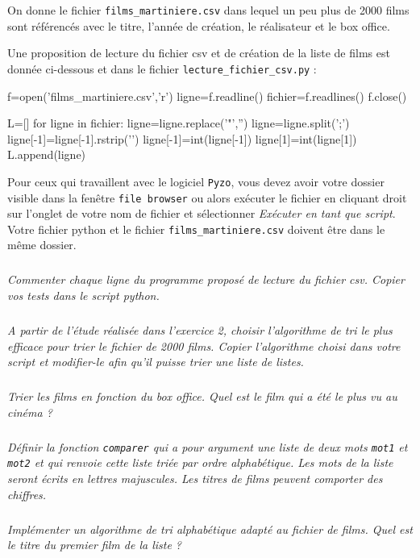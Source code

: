 On donne le fichier \texttt{films\_martiniere.csv} dans lequel un peu plus de 2000 films sont référencés avec le titre, l'année de création, le réalisateur et le box office.

Une proposition de lecture du fichier csv et de création de la liste de films est donnée ci-dessous et dans le fichier \texttt{lecture\_fichier\_csv.py} :

\begin{python}
f=open('films_martiniere.csv','r')
ligne=f.readline()
fichier=f.readlines()
f.close()

L=[]
for ligne in fichier:
    ligne=ligne.replace('"','')
    ligne=ligne.split(';')
    ligne[-1]=ligne[-1].rstrip('\n')
    ligne[-1]=int(ligne[-1])
    ligne[1]=int(ligne[1])
    L.append(ligne)
\end{python}

Pour ceux qui travaillent avec le logiciel \texttt{Pyzo}, vous devez avoir votre dossier visible dans la fenêtre \texttt{file browser} ou alors exécuter le fichier en cliquant droit sur l'onglet de votre nom de fichier et sélectionner \textit{Exécuter en tant que script}. Votre fichier python et le fichier \texttt{films\_martiniere.csv} doivent être dans le même dossier.

\subparagraph{}
\textit{Commenter chaque ligne du programme proposé de lecture du fichier csv. Copier vos tests dans le script python.}

\subparagraph{}
\textit{A partir de l'étude réalisée dans l'exercice 2, choisir l'algorithme de tri le plus efficace pour trier le fichier de 2000 films. Copier l'algorithme choisi dans votre script et modifier-le afin qu'il puisse trier une liste de listes.}

\subparagraph{}
\textit{Trier les films en fonction du box office. Quel est le film qui a été le plus vu au cinéma ?}

\subparagraph{}
\textit{Définir la fonction \texttt{comparer} qui a pour argument une liste de deux mots \texttt{mot1} et \texttt{mot2} et qui renvoie cette liste triée par ordre alphabétique. Les mots de la liste seront écrits en lettres majuscules. Les titres de films peuvent comporter des chiffres.}

\subparagraph{}
\textit{Implémenter un algorithme de tri alphabétique adapté au fichier de films. Quel est le titre du premier film de la liste ?}


